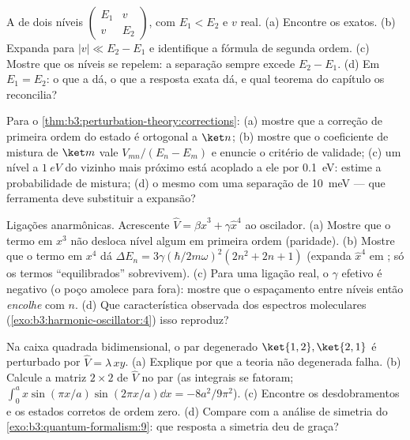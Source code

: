 \begin{exercise}[$\star$]\label{exo:b3:perturbation-theory:3}
A  de dois níveis $\begin{pmatrix}E_1 & v\\ v &
E_2\end{pmatrix}$, com $E_1 < E_2$ e $v$ real. (a) Encontre os
 exatos. (b) Expanda para $|v| \ll E_2 - E_1$ e identifique
a fórmula de segunda ordem. (c) Mostre que os níveis se repelem: a
separação sempre excede $E_2 - E_1$. (d) Em $E_1 = E_2$: o que a  dá, o que a resposta exata dá, e qual teorema do
capítulo os reconcilia?
\end{exercise}

\begin{exercise}[$\star$]\label{exo:b3:perturbation-theory:4}
Para o \cref{thm:b3:perturbation-theory:corrections}: (a) mostre que a
correção de primeira ordem do estado é ortogonal a $\ket n$; (b) mostre
que o coeficiente de mistura de $\ket m$ vale $V_{mn}/(E_n - E_m)$ e
enuncie o critério de validade; (c) um nível a $\qty{1}{eV}$ do vizinho
mais próximo está acoplado a ele por \qty{0.1}{eV}: estime a
probabilidade de mistura; (d) o mesmo com uma separação de
\qty{10}{meV} --- que ferramenta deve substituir a expansão?
\end{exercise}

\begin{exercise}[$\star\star$]\label{exo:b3:perturbation-theory:5}
Ligações anarmônicas. Acrescente $\hat V = \beta\hat x^3 + \gamma\hat x^4$
ao oscilador. (a) Mostre que o termo em $x^3$ não desloca nível algum
em primeira ordem (paridade). (b) Mostre que o termo em $x^4$ dá $\Delta E_n =
3\gamma(\hbar/2m\omega)^2(2n^2 + 2n + 1)$ (expanda
$\hat x^4$ em ; só os termos ``equilibrados''
sobrevivem). (c) Para uma ligação real, o $\gamma$ efetivo é negativo
(o poço amolece para fora): mostre que o espaçamento entre níveis então
\emph{encolhe} com $n$.
(d) Que característica observada dos espectros moleculares
(\cref{exo:b3:harmonic-oscillator:4}) isso reproduz?
\end{exercise}

\begin{exercise}[$\star\star$]\label{exo:b3:perturbation-theory:6}
Na caixa quadrada bidimensional, o par degenerado $\ket{1,2},
\ket{2,1}$ é perturbado por $\hat V = \lambda\,xy$. (a) Explique por
que a teoria não degenerada falha. (b) Calcule a matriz $2\times2$ de
$\hat V$ no par (as integrais se fatoram; $\int_0^a
x\sin(\pi x/a)\sin(2\pi x/a)\dd x = -8a^2/9\pi^2$). (c) Encontre os
desdobramentos e os estados corretos de ordem zero. (d) Compare com a
análise de simetria do \cref{exo:b3:quantum-formalism:9}: que resposta
a simetria deu de graça?
\end{exercise}

